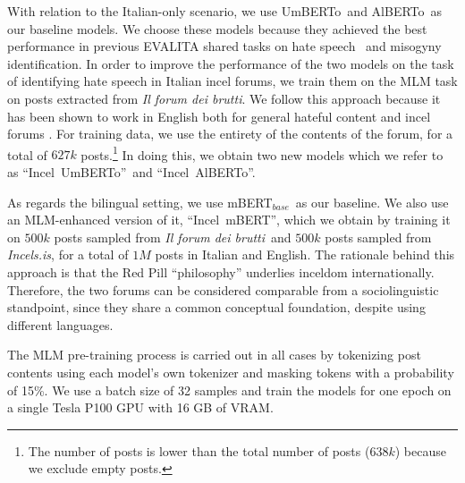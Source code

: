 \documentclass[11pt]{article}
\newcommand{\todoA}[1]{\todo[color=blue!40]{A: #1}}
\newcommand{\todoP}[1]{\todo[color=red]{P: #1}}
\newcommand{\mbert}{\mbox{mBERT$_{base}$}}
\newcommand{\imbert}{\mbox{Incel mBERT}}
\newcommand{\umbert}{\mbox{UmBERTo}}
\newcommand{\albert}{\mbox{AlBERTo}}
\newcommand{\iumbert}{\mbox{Incel UmBERTo}}
\newcommand{\ialbert}{\mbox{Incel AlBERTo}}
\newcommand{\enforum}{\textit{Incels.is}}
\newcommand{\itforum}{\textit{Il forum dei brutti}}
\begin{document}
With relation to the Italian-only scenario, we use \umbert\, and \albert\, as our baseline models. We choose these models because they achieved the best performance in previous EVALITA shared tasks on hate speech~\cite{basileEVALITA2020Overview} and misogyny~\cite{fersiniAMIEVALITA2020Automatic2020} identification.
In order to improve the performance of the two models on the task of identifying hate speech in Italian incel forums, we train them on the MLM task on posts extracted from \itforum. We follow this approach because it has been shown to work in English both for general hateful content \cite{caselli-etal-2021-hatebert} and incel forums \cite{gajo2023identification}. For training data, we use the entirety of the contents of the forum, for a total of $627k$ posts.\footnote{The number of posts is lower than the total number of posts ($638k$) because we exclude empty posts.} In doing this, we obtain two new models which we refer to as ``\iumbert''\, and ``\ialbert''.

As regards the bilingual setting, we use \mbert\, as our baseline. We also use an MLM-enhanced version of it, ``\imbert'', which we obtain by training it on $500k$ posts sampled from \itforum\, and $500k$ posts sampled from \enforum, for a total of $1M$ posts in Italian and English. The rationale behind this approach is that the Red Pill ``philosophy'' \cite{gingAlphasBetasIncels2019-manosphere} underlies inceldom internationally. Therefore, the two forums can be considered comparable from a sociolinguistic standpoint, since they share a common conceptual foundation, despite using different languages.

The MLM pre-training process is carried out in all cases by tokenizing post contents using each model's own tokenizer and masking tokens with a probability of 15\%. We use a batch size of 32 samples and train the models for one epoch on a single Tesla P100 GPU with 16 GB of VRAM.
\end{document}
